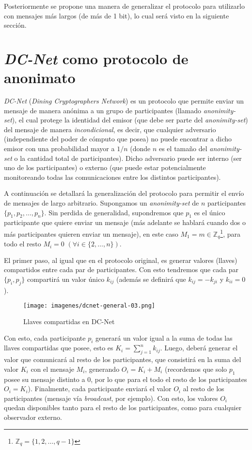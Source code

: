 Posteriormente se propone una manera de generalizar el protocolo para utilizarlo con mensajes más largos (de más de 1 bit), lo cual será 
visto en la siguiente sección.

\section{\emph{DC-Net} como protocolo de anonimato}

\emph{DC-Net} (\emph{Dining Cryptographers Network}) es un protocolo que permite enviar un mensaje de manera anónima a un grupo de participantes 
(llamado \emph{anonimity-set}), el cual protege la identidad del emisor (que debe ser parte del \emph{anonimity-set}) del mensaje de manera 
\emph{incondicional}, es decir, que cualquier adversario (independiente del poder de cómputo que posea) no puede encontrar a dicho emisor con 
una probabilidad mayor a $1/n$ (donde $n$ es el tamaño del \emph{anonimity-set} o la cantidad total de participantes). Dicho adversario puede 
ser interno (ser uno de los participantes) o externo (que puede estar potencialmente monitoreando todas las comunicaciones entre los distintos participantes).

A continuación se detallará la generalización del protocolo para permitir el envío de mensajes de largo arbitrario. 
Supongamos un \emph{anonimity-set} de $n$ participantes $\{p_1, p_2, \ldots, p_n\}$. Sin perdida de generalidad, supondremos que $p_1$ es el único 
participante que quiere enviar un mensaje (más adelante 
se hablará cuando dos o más participantes quieren enviar un mensaje), 
en este caso $M_1 = m \in \mathbb{Z}_q$\footnote{$\mathbb{Z}_q = \{1, 2, \ldots, q - 1\}$}, para todo el resto $M_i = 0$ $(\forall i \in \{2, \ldots, n\})$.

El primer paso, al igual que en el protocolo original, es generar valores (llaves) compartidos entre cada par de participantes. Con esto 
tendremos que cada par $\{p_i, p_j\}$ compartirá un valor único $k_{ij}$ (además se definirá que $k_{ij} = -k_{ji}$ y $k_{ii} = 0$).

\begin{figure}[H]
  \centering
    \texttt{[image: imagenes/dcnet-general-03.png]}
  \caption{Llaves compartidas en DC-Net}
\end{figure}

Con esto, cada participante $p_i$ generará un valor igual a la suma de todas las llaves compartidas que posee, esto es $K_i = \sum_{j=1}^n k_{ij}$. 
Luego, deberá generar el valor que comunicará al resto de los participantes, que consistirá en la suma del valor $K_i$ con el mensaje $M_i$, 
generando $O_i = K_i + M_i$ (recordemos que solo $p_1$ posee su mensaje distinto a 0, por lo que para el todo el resto de los participantes $O_i = K_i$). 
Finalmente, cada participante enviará el valor $O_i$ al resto de los participantes (mensaje vía \emph{broadcast}, por ejemplo). Con esto, los 
valores $O_i$ quedan disponibles tanto para el resto de los participantes, como para cualquier observador externo.

